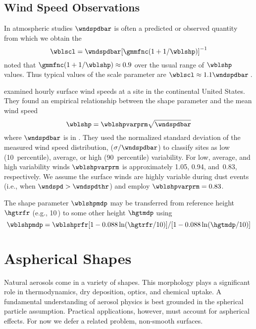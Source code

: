 \documentclass[12pt,twoside]{book}
\begin{document}
\subsection{Wind Speed Observations}\label{sxn:wbl_obs}
In atmospheric studies $\wndspdbar$ is often a predicted or observed
quantity from which we obtain the 
\begin{equation}
\wblscl = \wndspdbar [\gmmfnc (1 + 1/\wblshp)]^{-1}
\label{eqn:wbl_scl_dfn}
\end{equation}
\cite{GiP88} noted that $\gmmfnc (1 + 1/\wblshp) \approx 0.9$ over
the usual range of $\wblshp$ values.
Thus typical values of the scale parameter are 
$\wblscl \approx 1.1 \wndspdbar$\,\mxs.

\cite{JHM78} examined hourly surface wind speeds at a site in the
continental United States.
They found an empirical relationship between the shape parameter 
and the mean wind speed
\begin{equation}
\wblshp = \wblshpvarprm \sqrt{\wndspdbar}
\label{eqn:wbl_shp_dfn}
\end{equation}
where $\wndspdbar$ is in \mxs.
They used the normalized standard deviation of the measured wind speed
distribution, ($\sigma/\wndspdbar$) to classify sites as low
(10~percentile), average, or high (90~percentile) variability.  
For low, average, and high variability winds $\wblshpvarprm$ is
approximately 1.05, 0.94, and~0.83, respectively. 
We assume the surface winds are highly variable during dust events
(i.e., when $\wndspd > \wndspdthr$) and employ $\wblshpvarprm = 0.83$.

The shape parameter $\wblshpmdp$ may be transferred from reference
height $\hgtrfr$ (e.g., 10\,\m) to some other height $\hgtmdp$ using
\cite[]{JHM78}  
\begin{equation}
\wblshpmdp=\wblshprfr[1-0.088\ln(\hgtrfr/10)]/[1-0.088\ln(\hgtmdp/10)] 
\label{eqn:wbl_shp_mdp_dfn}
\end{equation}

\section[Aspherical Shapes]{Aspherical Shapes}\label{sxn:asp}
Natural aerosols come in a variety of shapes.
This morphology plays a significant role in thermodynamics, dry
deposition, optics, and chemical uptake.
A fundamental understanding of aerosol physics is best grounded in the
spherical particle assumption.
Practical applications, however, must account for aspherical effects.
For now we defer a related problem, non-smooth surfaces.
\end{document}

